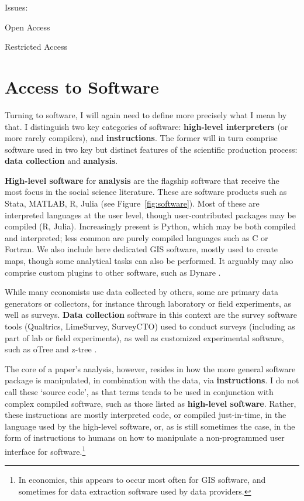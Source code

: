 \documentclass{article}
\begin{document}
{Issues:

Open Access

Restricted Access





\section{Access to Software}
\label{sec:software}

Turning to software, I will again need to define more precisely what I mean by that. I distinguish two key categories of software: \textbf{high-level interpreters} (or more rarely compilers), and \textbf{instructions}. The former will in turn comprise software used in two key but distinct features of the scientific production process: \textbf{data collection} and \textbf{analysis}. 

\textbf{High-level software} for \textbf{analysis} are the flagship software  that receive the most  focus in the social science literature. These are software products such as Stata, MATLAB, R, Julia (see Figure~\ref{fig:software}). Most of these are interpreted languages at the user level, though user-contributed packages may be compiled (R, Julia). Increasingly present is Python, which may be both compiled and interpreted; less common are purely compiled languages such as C or Fortran. We also include here dedicated \ac{GIS} software, mostly used to create maps, though some analytical tasks can also be performed. It arguably may also comprise custom plugins to other software, such as Dynare \citep{adjemian_dynare_2024,cherrier_write_2023}.



While many economists use data collected by others, some are primary data generators or collectors, for instance through laboratory or field experiments, as well as surveys. \textbf{Data collection} software in this context are the survey software tools (Qualtrics, LimeSurvey, SurveyCTO) used to conduct surveys (including as part of lab or field experiments), as well as customized experimental software, such as oTree \citep{chen_otreeopen-source_2016} and z-tree \citep{fischbache_z-tree_2021}.

The core of a paper's analysis, however, resides in how the more general software package is manipulated, in combination with the data, via \textbf{instructions}. I do not call these `source code', as that terms tends to be used in conjunction with complex compiled software, such as those listed as \textbf{high-level software}. Rather, these instructions are mostly interpreted code, or compiled just-in-time, in the language used by the high-level software, or, as is still sometimes the case, in the form of instructions to humans on how to manipulate a non-programmed user interface for software.\footnote{In economics, this appears to occur most often for \ac{GIS} software, and sometimes for data extraction software used by data providers.}

}
\end{document}
